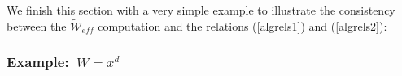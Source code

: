 \documentclass[a4paper,11pt]{article}
\def\cA{\mathcal{A}}
\newcommand{\Af}{{A_\infty}}
\numberwithin{equation}{section}
\begin{document}


We finish this section with a very simple example to illustrate the consistency 
between the $\widetilde{\mathcal{W}}_{eff}$ computation and the relations 
(\ref{algrels1}) and (\ref{algrels2}):

\subsubsection*{Example:~$W=x^d$}
\end{document}
